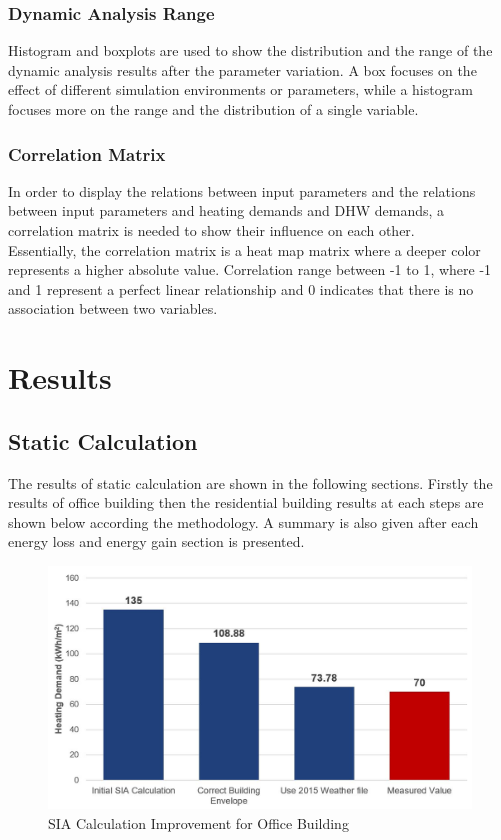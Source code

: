 \documentclass[a4paper, oneside]{discothesis}
\begin{document}
		\subsection{Dynamic Analysis Range}
			Histogram and boxplots are used to show the distribution and the range of the dynamic analysis results after the parameter variation. A box focuses on the effect of different simulation environments or parameters, while a histogram focuses more on the range and the distribution of a single variable.

		\subsection{Correlation Matrix}
			In order to display the relations between input parameters and the relations between input parameters and heating demands and DHW demands, a correlation matrix is needed to show their influence on each other. \\
			Essentially, the correlation matrix is a heat map matrix where a deeper color represents a higher absolute value. Correlation range between -1 to 1, where -1 and 1 represent a perfect linear relationship and 0 indicates that there is no association between two variables.\\
		

\chapter{Results}

	\section{Static Calculation}
		The results of static calculation are shown in the following sections. Firstly the results of office building then the residential building results at each steps are shown below according the methodology. A summary is also given after each energy loss and energy gain section is presented.

		\begin{figure}[htbp]
		\centering
		\includegraphics[scale=0.4]{Office_SIA.jpg}
		\caption{SIA Calculation Improvement for Office Building}
		\label{fig:Sumatra_SIA}
		\end{figure}
		
\end{document}
